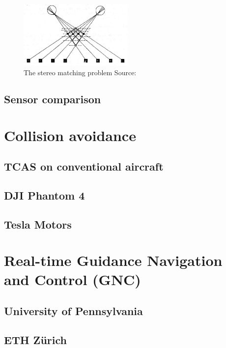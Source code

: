 \begin{figure}[htbp]
	\centering
	\includegraphics[width=0.5\textwidth]{./figures/stereo.png}
	\caption{The stereo matching problem {\footnotesize Source: \cite{ballard1982}}}
	\label{fig:stereo}
\end{figure}


\subsection{Sensor comparison} \label{sec:sensorCompare}


\section{Collision avoidance}

\subsection{TCAS on conventional aircraft}

\subsection{DJI Phantom 4}

\subsection{Tesla Motors}


\section{Real-time Guidance Navigation and Control (GNC)}

\subsection{University of Pennsylvania}

\subsection{ETH Z\"urich}


